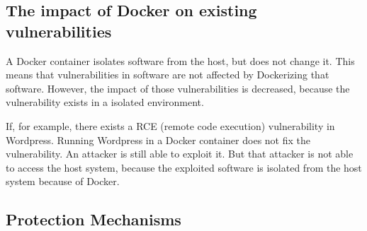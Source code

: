 \subsection{The impact of Docker on existing vulnerabilities}
A Docker container isolates software from the host, but does not change it. This means that vulnerabilities in software are not affected by Dockerizing that software. However, the impact of those vulnerabilities is decreased, because the vulnerability exists in a isolated environment.

If, for example, there exists a RCE (remote code execution) vulnerability in Wordpress. Running Wordpress in a Docker container does not fix the vulnerability. An attacker is still able to exploit it. But that attacker is not able to access the host system, because the exploited software is isolated from the host system because of Docker.

\subsection{Protection Mechanisms}
